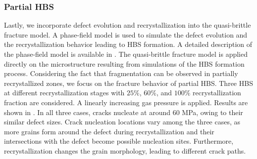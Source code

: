 \subsubsection{Partial HBS}

Lastly, we incorporate defect evolution and recrystallization into the quasi-brittle fracture model. A phase-field model is used to simulate the defect evolution and the recrystallization behavior leading to HBS formation. A detailed description of the phase-field model is available in \cite{Aagesen2020}. The quasi-brittle fracture model is applied directly on the microstructure resulting from simulations of the HBS formation process. Considering the fact that fragmentation can be observed in partially recrystallized zones, we focus on the fracture behavior of partial HBS.
Three HBS at different recrystallization stages with $25\%$, $60\%$, and $100\%$ recrystallization fraction are considered. A linearly increasing gas pressure is applied. Results are shown in . In all three cases, cracks nucleate at around 60 MPa, owing to their similar defect sizes. Crack nucleation locations vary among the three cases, as more grains form around the defect during recrystallization and their intersections with the defect become possible nucleation sites. Furthermore, recrystallization changes the grain morphology, leading to different crack paths.

